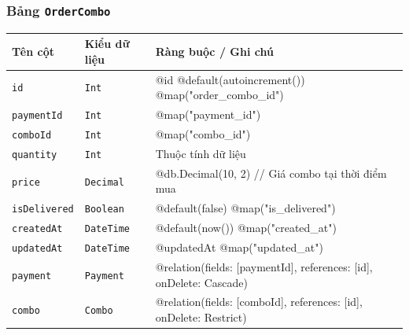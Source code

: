 \subsubsection{Bảng \texttt{OrderCombo}}
\begin{longtable}{|p{3.6cm}|p{3.0cm}|p{8.9cm}|}
\hline
\rowcolor{headerblue} \textbf{Tên cột} & \textbf{Kiểu dữ liệu} & \textbf{Ràng buộc / Ghi chú} \\ \hline
\endhead
\texttt{id} & \texttt{Int} & \small @id @default(autoincrement()) @map("order\_combo\_id") \\ \hline
\texttt{paymentId} & \texttt{Int} & \small @map("payment\_id") \\ \hline
\texttt{comboId} & \texttt{Int} & \small @map("combo\_id") \\ \hline
\texttt{quantity} & \texttt{Int} & \small Thuộc tính dữ liệu \\ \hline
\texttt{price} & \texttt{Decimal} & \small @db.Decimal(10, 2) // Giá combo tại thời điểm mua \\ \hline
\texttt{isDelivered} & \texttt{Boolean} & \small @default(false) @map("is\_delivered") \\ \hline
\texttt{createdAt} & \texttt{DateTime} & \small @default(now()) @map("created\_at") \\ \hline
\texttt{updatedAt} & \texttt{DateTime} & \small @updatedAt @map("updated\_at") \\ \hline
\texttt{payment} & \texttt{Payment} & \small @relation(fields: [paymentId], references: [id], onDelete: Cascade) \\ \hline
\texttt{combo} & \texttt{Combo} & \small @relation(fields: [comboId], references: [id], onDelete: Restrict) \\ \hline
\end{longtable}

